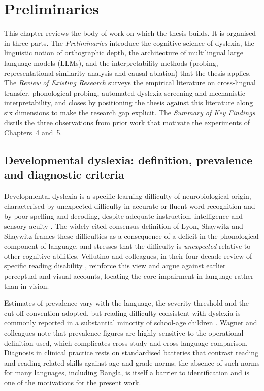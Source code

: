 \section{Preliminaries}

This chapter reviews the body of work on which the thesis builds. It is organised in three parts. The \emph{Preliminaries} introduce the cognitive science of dyslexia, the linguistic notion of orthographic depth, the architecture of multilingual large language models (LLMs), and the interpretability methods (probing, representational similarity analysis and causal ablation) that the thesis applies. The \emph{Review of Existing Research} surveys the empirical literature on cross-lingual transfer, phonological probing, automated dyslexia screening and mechanistic interpretability, and closes by positioning the thesis against this literature along six dimensions to make the research gap explicit. The \emph{Summary of Key Findings} distils the three observations from prior work that motivate the experiments of Chapters~4 and~5.

\subsection{Developmental dyslexia: definition, prevalence and diagnostic criteria}

Developmental dyslexia is a specific learning difficulty of neurobiological origin, characterised by unexpected difficulty in accurate or fluent word recognition and by poor spelling and decoding, despite adequate instruction, intelligence and sensory acuity \cite{lyon2003definition,snowling2020dyslexia,peterson2012developmental}. The widely cited consensus definition of Lyon, Shaywitz and Shaywitz \cite{lyon2003definition} frames these difficulties as a consequence of a deficit in the phonological component of language, and stresses that the difficulty is \emph{unexpected} relative to other cognitive abilities. Vellutino and colleagues, in their four-decade review of specific reading disability \cite{vellutino2004specific}, reinforce this view and argue against earlier perceptual and visual accounts, locating the core impairment in language rather than in vision.

Estimates of prevalence vary with the language, the severity threshold and the cut-off convention adopted, but reading difficulty consistent with dyslexia is commonly reported in a substantial minority of school-age children \cite{vellutino2004specific,wagner2020prevalence}. Wagner and colleagues \cite{wagner2020prevalence} note that prevalence figures are highly sensitive to the operational definition used, which complicates cross-study and cross-language comparison. Diagnosis in clinical practice rests on standardised batteries that contrast reading and reading-related skills against age and grade norms; the absence of such norms for many languages, including Bangla, is itself a barrier to identification and is one of the motivations for the present work.

